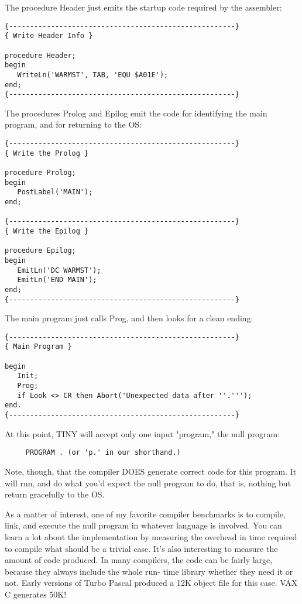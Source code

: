 The procedure Header just emits  the startup code required by the assembler:

\begin{verbatim}
{------------------------------------------------------}
{ Write Header Info }

procedure Header;
begin
   WriteLn('WARMST', TAB, 'EQU $A01E');
end;
{------------------------------------------------------}
\end{verbatim}

The procedures Prolog and  Epilog  emit  the code for identifying the main program, and for returning to the OS:

\begin{verbatim}
{------------------------------------------------------}
{ Write the Prolog }

procedure Prolog;
begin
   PostLabel('MAIN');
end;

{------------------------------------------------------}
{ Write the Epilog }

procedure Epilog;
begin
   EmitLn('DC WARMST');
   EmitLn('END MAIN');
end;
{------------------------------------------------------}
\end{verbatim}

The  main program just calls Prog, and then  looks  for  a  clean ending:

\begin{verbatim}
{------------------------------------------------------}
{ Main Program }

begin
   Init;
   Prog;
   if Look <> CR then Abort('Unexpected data after ''.''');
end.
{------------------------------------------------------}
\end{verbatim}

At this point, TINY  will  accept  only  one input "program," the null program:

\begin{verbatim}
     PROGRAM . (or 'p.' in our shorthand.)
\end{verbatim}

Note, though, that the  compiler  DOES  generate correct code for this program. It will run, and do  what  you'd  expect  the null program to do, that is, nothing but return gracefully to the OS.

As a matter of interest, one of my  favorite  compiler benchmarks is to compile, link, and  execute  the  null program in whatever language   is   involved. You  can  learn  a  lot  about  the implementation by measuring  the  overhead  in  time  required to compile what should be a trivial case. It's also  interesting to measure the amount of code produced. In many compilers, the code can be fairly large, because they always include  the  whole run- time  library whether they need it or not. Early  versions  of Turbo Pascal produced a 12K object file for  this  case. VAX C generates 50K!

